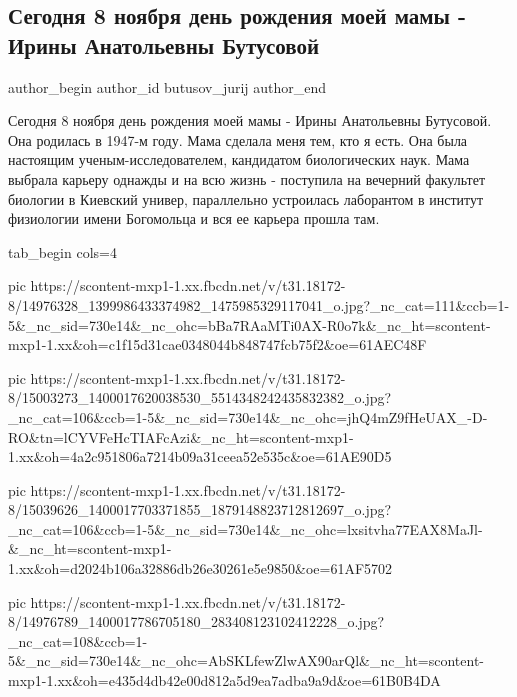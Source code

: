  
 
 
 
 
 
\subsection{Сегодня 8 ноября день рождения моей мамы - Ирины Анатольевны Бутусовой}
\label{sec:08_11_2016.fb.butusov_jurij.1.mama_birthday}
 
\ifcmt
 author_begin
   author_id butusov_jurij
 author_end
\fi

Сегодня 8 ноября день рождения моей мамы - Ирины Анатольевны Бутусовой. Она
родилась в 1947-м году. Мама сделала меня тем, кто я есть. Она была настоящим
ученым-исследователем, кандидатом биологических наук. Мама выбрала карьеру
однажды и на всю жизнь - поступила на вечерний факультет биологии в Киевский
универ, параллельно устроилась лаборантом в институт физиологии имени
Богомольца и вся ее карьера прошла там. 

\ifcmt
  tab_begin cols=4

     pic https://scontent-mxp1-1.xx.fbcdn.net/v/t31.18172-8/14976328_1399986433374982_1475985329117041_o.jpg?_nc_cat=111&ccb=1-5&_nc_sid=730e14&_nc_ohc=bBa7RAaMTi0AX-R0o7k&_nc_ht=scontent-mxp1-1.xx&oh=c1f15d31cae0348044b848747fcb75f2&oe=61AEC48F

     pic https://scontent-mxp1-1.xx.fbcdn.net/v/t31.18172-8/15003273_1400017620038530_5514348242435832382_o.jpg?_nc_cat=106&ccb=1-5&_nc_sid=730e14&_nc_ohc=jhQ4mZ9fHeUAX_-D-RO&tn=lCYVFeHcTIAFcAzi&_nc_ht=scontent-mxp1-1.xx&oh=4a2c951806a7214b09a31ceea52e535c&oe=61AE90D5

     pic https://scontent-mxp1-1.xx.fbcdn.net/v/t31.18172-8/15039626_1400017703371855_1879148823712812697_o.jpg?_nc_cat=106&ccb=1-5&_nc_sid=730e14&_nc_ohc=lxsitvha77EAX8MaJl-&_nc_ht=scontent-mxp1-1.xx&oh=d2024b106a32886db26e30261e5e9850&oe=61AF5702

     pic https://scontent-mxp1-1.xx.fbcdn.net/v/t31.18172-8/14976789_1400017786705180_283408123102412228_o.jpg?_nc_cat=108&ccb=1-5&_nc_sid=730e14&_nc_ohc=AbSKLfewZlwAX90arQl&_nc_ht=scontent-mxp1-1.xx&oh=e435d4db42e00d812a5d9ea7adba9a9d&oe=61B0B4DA

